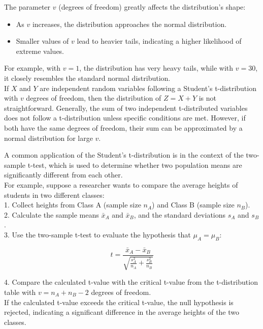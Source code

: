 The parameter \( v \) (degrees of freedom) greatly affects the distribution's shape:
\begin{itemize}
    \item As \( v \) increases, the distribution approaches the normal distribution.
    \item Smaller values of \( v \) lead to heavier tails, indicating a higher likelihood of extreme values.
\end{itemize}

For example, with \( v = 1 \), the distribution has very heavy tails, while with \( v = 30 \), it closely resembles the standard normal distribution.\\

If \( X \) and \( Y \) are independent random variables following a Student's t-distribution with \( v \) degrees of freedom, then the distribution of \( Z = X + Y \) is not straightforward. Generally, the sum of two independent t-distributed variables does not follow a t-distribution unless specific conditions are met. However, if both have the same degrees of freedom, their sum can be approximated by a normal distribution for large \( v \).

\begin{example}
    A common application of the Student's t-distribution is in the context of the two-sample t-test, which is used to determine whether two population means are significantly different from each other. \\

For example, suppose a researcher wants to compare the average heights of students in two different classes:\\

1. Collect heights from Class A (sample size \( n_A \)) and Class B (sample size \( n_B \)).\\
2. Calculate the sample means \( \bar{x}_A \) and \( \bar{x}_B \), and the standard deviations \( s_A \) and \( s_B \).\\
3. Use the two-sample t-test to evaluate the hypothesis that \( \mu_A = \mu_B \):

\[
t = \frac{\bar{x}_A - \bar{x}_B}{\sqrt{\frac{s_A^2}{n_A} + \frac{s_B^2}{n_B}}}
\]

4. Compare the calculated t-value with the critical t-value from the t-distribution table with \( v = n_A + n_B - 2 \) degrees of freedom.\\

If the calculated t-value exceeds the critical t-value, the null hypothesis is rejected, indicating a significant difference in the average heights of the two classes.

\end{example}
